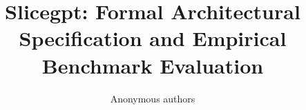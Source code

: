 \title{\textbf{Slicegpt: Formal Architectural Specification and Empirical Benchmark Evaluation}}

\author{Anonymous authors}
